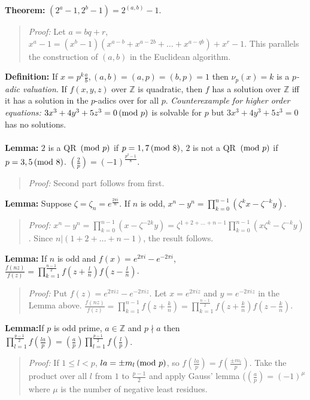 \\
\\
{\bf Theorem:} 
$(2^a -1, 2^b -1)= 2^{(a,b)} -1$.
\begin{quote}
\emph{Proof:} Let $a=bq+r$, $x^a -1 = (x^b -1) (x^{a-b} + x^{a-2b} + \ldots +
x^{a-qb})+ x^r -1$.  This parallels the construction of $(a,b)$ in the
Euclidean algorithm.  
\end{quote}
{\bf Definition:}
If $x= p^k {\frac a b}, (a,b)=(a,p)=(b,p)=1$ then $\nu_p (x) = k$
is a \emph{$p$-adic valuation}.
If $f(x,y,z)$ over ${\mathbb Z}$ is quadratic, then $f$ has a solution 
over ${\mathbb Z}$ iff it
has a solution in the $p$-adics over for all $p$.
\emph{
Counterexample for higher order equations:}
$3x^3 +4y^3+5z^3=0 \thinspace \textnormal{(mod } p \textnormal{)}$
is solvable for $p$ but
$3x^3 +4y^3+5z^3=0$ has no solutions.
\\
\\
{\bf Lemma:} $2$ is a QR $\thinspace \textnormal{(mod } p \textnormal{)}$ if $p= 1,7 \thinspace \textnormal{(mod } 8 \textnormal{)}$, $2$ is not
a QR $\thinspace \textnormal{(mod } p \textnormal{)}$ if $p= 3,5 \thinspace \textnormal{(mod } 8 \textnormal{)}$. $({\frac {2}{p}})= (-1)^{\frac {p^2-1} 8}$.
\begin{quote}
\emph{Proof:} Second part follows from first.
\end{quote}
{\bf Lemma:} Suppose $\zeta= \zeta_n= e^{\frac {2 \pi i} {n}}$.  If $n$ is odd,
$x^n-y^n= \prod_{k=0}^{n-1} (\zeta^k x - \zeta^{-k} y)$.
\begin{quote}
\emph{Proof:} 
$x^n-y^n= 
\prod_{k=0}^{n-1} (x- \zeta^{-2k}y)=
\zeta^{1+2+\ldots+n-1}\prod_{k=0}^{n-1} (x \zeta^k- \zeta^{-k}y)$.
Since $n|(1+2+\ldots+n-1)$, the result follows.
\end{quote}
{\bf Lemma:} If $n$ is odd and $f(x)= e^{2 \pi i} - e^{-2 \pi i}$,
${\frac {f(nz)} {f(z)}}= \prod_{k=1}^{\frac {n-1} 2} f(z+ {\frac l n})
f(z- {\frac l n})$.
\begin{quote}
\emph{Proof:} 
Put $f(z)= e^{2 \pi i z}-e^{-2 \pi i z}$. Let 
$x=e^{2 \pi i z}$ and
$y=e^{-2 \pi i z}$ in the Lemma above.
${\frac {f(nz)} {f(z)}} = \prod_{k=1}^{n-1} f(z+{\frac k n})=
\prod_{k=1}^{\frac {n-1} 2} f(z+{\frac k n}) f(z-{\frac k n}) $.
\end{quote}
{\bf Lemma:}If $p$ is odd prime, $a \in \mathbb Z$ and $p \nmid a$ then
$\prod_{l=1}^{\frac {p-1} 2} f({\frac {la} {p}})= ({\frac a p}) \prod_{l=1}^{\frac {p-1} 2}
f({\frac l p})$. 
\begin{quote}
\emph{Proof:} 
If $1 \leq l <p$, $la= \pm m_l \thinspace \textnormal{(mod } p \textnormal{)}$, so
$f({\frac {la} p})= f({\frac {\pm m_l} p})$.  Take the product over all $l$ from
$1$ to ${\frac {p-1} 2}$ and apply Gauss' lemma ($({\frac a p})= (-1)^{\mu}$ where $\mu$
is the number of negative least residues.
\end{quote}
